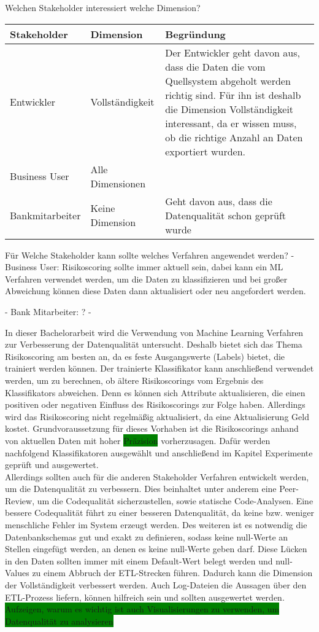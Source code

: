 Welchen Stakeholder interessiert welche Dimension?

\begin{tabular}[h]{l|l|l}
Stakeholder & Dimension & Begründung \\ \hline
Entwickler & Vollständigkeit & Der Entwickler geht davon aus, dass die Daten die vom Quellsystem abgeholt werden richtig sind. Für ihn ist deshalb die Dimension Vollständigkeit interessant, da er wissen muss, ob die richtige Anzahl an Daten exportiert wurden. \\ \hline
Business User & Alle Dimensionen & \\ \hline
Bankmitarbeiter & Keine Dimension & Geht davon aus, dass die Datenqualität schon geprüft wurde \\
\end{tabular}


Für Welche Stakeholder kann sollte welches Verfahren angewendet werden?
- Business User: Risikoscoring sollte immer aktuell sein, dabei kann ein ML Verfahren verwendet werden, um die Daten zu klassifizieren und bei großer Abweichung können diese Daten dann aktualisiert oder neu angefordert werden.

- Bank Mitarbeiter: ?
- 

In dieser Bachelorarbeit wird die Verwendung von Machine Learning Verfahren zur Verbesserung der Datenqualität untersucht.
Deshalb bietet sich das Thema Risikoscoring am besten an, da es feste Ausgangswerte (Labels) bietet, die trainiert werden können.
Der trainierte Klassifikator kann anschließend verwendet werden, um zu berechnen, ob ältere Risikoscorings vom Ergebnis des Klassifikators abweichen.
Denn es können sich Attribute aktualisieren, die einen positiven oder negativen Einfluss des Risikoscorings zur Folge haben. 
Allerdings wird das Risikoscoring nicht regelmäßig aktualisiert, da eine Aktualisierung Geld kostet.
Grundvoraussetzung für dieses Vorhaben ist die Risikoscorings anhand von aktuellen Daten mit hoher \colorbox{green}{Präzision} vorherzusagen. 
Dafür werden nachfolgend Klassifikatoren ausgewählt und anschließend im Kapitel Experimente geprüft und ausgewertet.\\
Allerdings sollten auch für die anderen Stakeholder Verfahren entwickelt werden, um die Datenqualität zu verbessern.
Dies beinhaltet unter anderem eine Peer-Review, um die Codequalität sicherzustellen, sowie statische Code-Analysen.
Eine bessere Codequalität führt zu einer besseren Datenqualität, da keine bzw. weniger menschliche Fehler im System erzeugt werden.
Des weiteren ist es notwendig die Datenbankschemas gut und exakt zu definieren, sodass keine null-Werte an Stellen eingefügt werden, an denen es keine null-Werte geben darf.
Diese Lücken in den Daten sollten immer mit einem Default-Wert belegt werden und null-Values zu einem Abbruch der ETL-Strecken führen.
Dadurch kann die Dimension der Vollständigkeit verbessert werden.
Auch Log-Dateien die Aussagen über den ETL-Prozess liefern, können hilfreich sein und sollten ausgewertet werden.
\colorbox{green}{Aufzeigen, warum es wichtig ist auch Visualisierungen zu verwenden, um Datenqualität zu analysieren}

